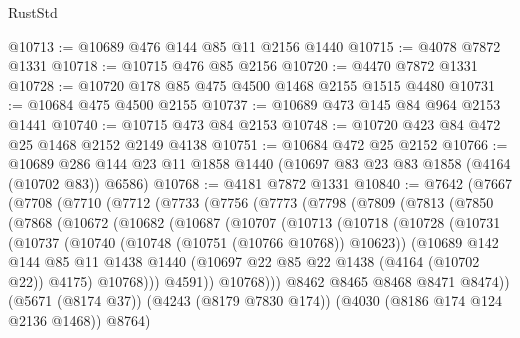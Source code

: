 \begin{lexlean}{RustStd}
\begin{coremodule}
@10713 := @10689 @476 @144 @85 @11 @2156 @1440
@10715 := @4078 @7872 @1331
@10718 := @10715 @476 @85 @2156
@10720 := @4470 @7872 @1331
@10728 := @10720 @178 @85 @475 @4500 @1468 @2155 @1515 @4480
@10731 := @10684 @475 @4500 @2155
@10737 := @10689 @473 @145 @84 @964 @2153 @1441
@10740 := @10715 @473 @84 @2153
@10748 := @10720 @423 @84 @472 @25 @1468 @2152 @2149 @4138
@10751 := @10684 @472 @25 @2152
@10766 := @10689 @286 @144 @23 @11 @1858 @1440 (@10697 @83 @23 @83 @1858 (@4164 (@10702 @83)) @6586)
@10768 := @4181 @7872 @1331
@10840 := @7642
    (@7667
      (@7708
        (@7710
          (@7712
            (@7733
              (@7756
                (@7773
                  (@7798
                    (@7809
                      (@7813
                        (@7850
                          (@7868
                            (@10672
                              (@10682
                                (@10687
                                  (@10707
                                    (@10713
                                      (@10718
                                        (@10728
                                          (@10731
                                            (@10737
                                              (@10740 (@10748 (@10751 (@10766 @10768)) @10623))
                                              (@10689
                                                @142
                                                @144
                                                @85
                                                @11
                                                @1438
                                                @1440
                                                (@10697
                                                  @22
                                                  @85
                                                  @22
                                                  @1438
                                                  (@4164 (@10702 @22))
                                                  @4175)
                                                @10768)))
                                          @4591))
                                      @10768)))
                                @8462
                                @8465
                                @8468
                                @8471
                                @8474))
                            (@5671 (@8174 @37))
                            (@4243 (@8179 @7830 @174))
                            (@4030 (@8186 @174 @124 @2136 @1468))
                            @8764)

\end{coremodule}
\end{lexlean}
